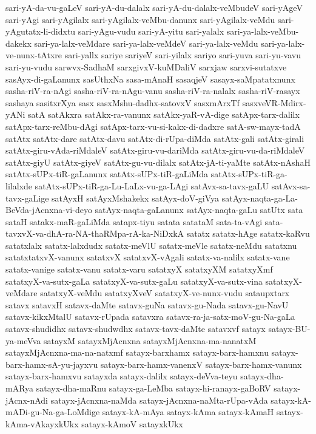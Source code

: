 {sari-yA-da-vu-gaLeV
sari-yA-du-dalalx
sari-yA-du-dalalx-veMbudeV
sari-yAgeV
sari-yAgi
sari-yAgilalx
sari-yAgilalx-veMbu-danunx
sari-yAgilalx-veMdu
sari-yAgutatx-li-didxtu
sari-yAgu-vudu
sari-yA-yitu
sari-yalalx
sari-ya-lalx-veMbu-dakekx
sari-ya-lalx-veMdare
sari-ya-lalx-veMdeV
sari-ya-lalx-veMdu
sari-ya-lalx-ve-nunx-tAtxre
sari-yallx
sariye
sariyeV
sari-yilalx
sariyo
sari-yuva
sari-yu-vavu
sari-yu-vudu
sarwvx-SadhaM
sarxgivxV-kuMDaliV
sarxjaw
sarxvi-sutatxve
sasAyx-di-gaLanunx
sasUthxNa
sasa-mAnaH
sasaqjeV
sasayx-saMpatatxnunx
sasha-riV-ra-nAgi
sasha-riV-ra-nAgu-vanu
sasha-riV-ra-nalalx
sasha-riV-rasayx
sashaya
sasitxrXya
sasx
sasxMshu-dadhx-satovxV
sasxmArxTf
sasxveVR-Mdirx-yANi
satA
satAkxra
satAkx-ra-vanunx
satAkx-yaR-vA-dige
satApx-tarx-dalilx
satApx-tarx-reMbu-dAgi
satApx-tarx-vu-si-kakx-di-dadxre
satA-sw-mayx-tadA
satAtx
satAtx-dare
satAtx-davu
satAtx-di-rUpa-diMda
satAtx-gali
satAtx-girali
satAtx-giru-vAda-riMdaleV
satAtx-giru-vu-dariMda
satAtx-giru-vu-da-riMdaleV
satAtx-giyU
satAtx-giyeV
satAtx-gu-vu-dilalx
satAtx-jA-ti-yaMte
satAtx-nAshaH
satAtx-sUPx-tiR-gaLanunx
satAtx-sUPx-tiR-gaLiMda
satAtx-sUPx-tiR-ga-lilalxde
satAtx-sUPx-tiR-ga-Lu-LaLx-vu-ga-LAgi
satAvx-sa-tavx-gaLU
satAvx-sa-tavx-gaLige
satAyxH
satAyxMshakekx
satAyx-doV-giVya
satAyx-naqta-ga-La-BeVda-jAcnxna-vi-deyo
satAyx-naqta-gaLanunx
satAyx-naqta-gaLu
satUtx
sata
sataH
satakx-maR-gaLiMda
satapx-tiyu
satata
satataM
sata-ta-vAgi
sata-tavxvX-va-dhA-ra-NA-thaRMpa-rA-ka-NiDxkA
satatx
satatx-hAge
satatx-kaRvu
satatxlalx
satatx-lalxdudx
satatx-meVlU
satatx-meVle
satatx-neMdu
satatxnu
satatxtatxvX-vanunx
satatxvX
satatxvX-vAgali
satatx-va-nalilx
satatx-vane
satatx-vanige
satatx-vanu
satatx-varu
satatxyX
satatxyXM
satatxyXmf
satatxyX-va-sutx-gaLa
satatxyX-va-sutx-gaLu
satatxyX-va-sutx-vina
satatxyX-veMdare
satatxyX-veMdu
satatxyXveV
satatxyX-ve-nunx-vudu
sataupxtarx
satavx
satavxH
satavx-daMte
satavx-guNa
satavx-gu-Nada
satavx-gu-NavU
satavx-kikxMtalU
satavx-rUpada
satavxra
satavx-ra-ja-satx-moV-gu-Na-gaLa
satavx-shudidhx
satavx-shudwdhx
satavx-tavx-daMte
satavxvf
satayx
satayx-BU-ya-meVva
satayxM
satayxMjAcnxna
satayxMjAcnxna-ma-nanatxM
satayxMjAcnxna-ma-na-natxmf
satayx-barxhamx
satayx-barx-hamxnu
satayx-barx-hamx-sA-yu-jayxvu
satayx-barx-hamx-vanenxV
satayx-barx-hamx-vanunx
satayx-barx-hamxvu
satayxda
satayx-dalilx
satayx-deVva-teyu
satayx-dha-mARya
satayx-dha-maRnu
satayx-ga-LeMba
satayx-hi-ranayx-gaBoRV
satayx-jAcnx-nAdi
satayx-jAcnxna-naMda
satayx-jAcnxna-naMta-rUpa-vAda
satayx-kA-mADi-gu-Na-ga-LoMdige
satayx-kA-mAya
satayx-kAma
satayx-kAmaH
satayx-kAma-vAkayxkUkx
satayx-kAmoV
satayxkUkx
}
